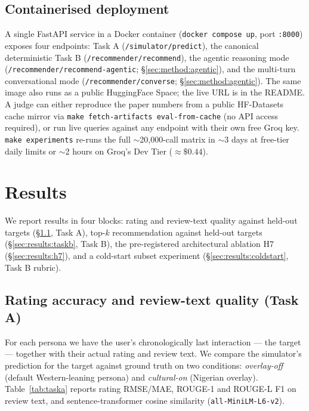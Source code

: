 \documentclass[8pt,twocolumn,a4paper]{extarticle}
\begin{document}
\subsection{Containerised deployment}

A single FastAPI service in a Docker container (\texttt{docker compose up}, port \texttt{:8000}) exposes four endpoints: Task A (\texttt{/simulator/predict}), the canonical deterministic Task B (\texttt{/recommender/recommend}), the agentic reasoning mode (\texttt{/recommender/recommend-agentic}; \S\ref{sec:method:agentic}), and the multi-turn conversational mode (\texttt{/recommender/converse}; \S\ref{sec:method:agentic}). The same image also runs as a public HuggingFace Space; the live URL is in the README. A judge can either reproduce the paper numbers from a public HF-Datasets cache mirror via \texttt{make fetch-artifacts eval-from-cache} (no API access required), or run live queries against any endpoint with their own free Groq key. \texttt{make experiments} re-runs the full $\sim$20{,}000-call matrix in $\sim$3 days at free-tier daily limits or $\sim$2 hours on Groq's Dev Tier ($\approx\$0.44$).

\section{Results}
\label{sec:results}

We report results in four blocks: rating and review-text quality against held-out targets (\S\ref{sec:results:taska}, Task A), top-$k$ recommendation against held-out targets (\S\ref{sec:results:taskb}, Task B), the pre-registered architectural ablation H7 (\S\ref{sec:results:h7}), and a cold-start subset experiment (\S\ref{sec:results:coldstart}, Task B rubric).

\subsection{Rating accuracy and review-text quality (Task A)}
\label{sec:results:taska}

For each persona we have the user's chronologically last interaction --- the target --- together with their actual rating and review text. We compare the simulator's prediction for the target against ground truth on two conditions: \emph{overlay-off} (default Western-leaning persona) and \emph{cultural-on} (Nigerian overlay). Table~\ref{tab:taska} reports rating RMSE/MAE, ROUGE-1 and ROUGE-L F1 on review text, and sentence-transformer cosine similarity (\texttt{all-MiniLM-L6-v2}).
\end{document}
